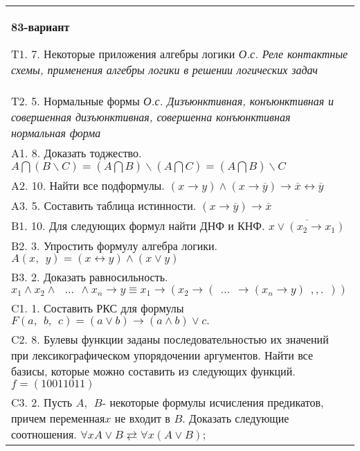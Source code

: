 \documentclass{article}
\begin{document}
\begin{tabular}{m{17cm}}
\textbf{83-вариант}
\newline

T1. 7. Некоторые приложения алгебры логики \emph{О.с. Реле контактные схемы, применения алгебры логики в решении логических задач} \\
T2. 5. Нормальные формы \emph{О.с. Дизъюнктивная, конъюнктивная и совершенная дизъюнктивная, совершенна конъюнктивная нормальная форма} \\
A1. 8. Доказать тоджество. \(A\bigcap(B\backslash C) = (A\bigcap B)\backslash(A\bigcap C) = (A\bigcap B)\backslash C\) \\
A2. 10. Найти все подформулы. \((x \rightarrow y) \land (x \rightarrow \overline{y}) \rightarrow \overline{x} \leftrightarrow \overline{y}\) \\
A3. 5. Составить таблица истинности. \((x \rightarrow \overline{y}) \rightarrow \overline{x}\) \\
B1. 10. Для следующих формул найти ДНФ и КНФ. \(\overline{x \vee (x_{2} \rightarrow x_{1})}\) \\
B2. 3. Упростить формулу алгебра логики. \(A(x,\ \ y) = (x \leftrightarrow y) \land (x \vee y)\) \\
B3. 2. Доказать равносильность.\(x_{1} \land x_{2} \land \ \ \ ...\ \  \land x_{n} \rightarrow y \equiv x_{1} \rightarrow (x_{2} \rightarrow (\ \ ...\ \  \rightarrow (x_{n} \rightarrow y)\ \ ,,.\ \ ))\) \\
C1. 1. Составить РКС для формулы \(F(a,\ \ b,\ \ c) = (a \vee b) \rightarrow (a \land b) \vee c.\) \\
C2. 8. Булевы функции заданы последовательностью их значений при лексикографическом упорядочении аргументов. Найти все базисы, которые можно составить из следующих функций. \(f = (10011011)\) \\
C3. 2. Пусть \(A,\ \ B\)- некоторые формулы исчисления предикатов, причем переменная\(x\) не входит в \(B\). Доказать следующие соотношения. \(\forall xA \vee B \rightleftarrows \forall x(A \vee B)\); \\

\end{tabular}
\vspace{1cm}
\end{document}
